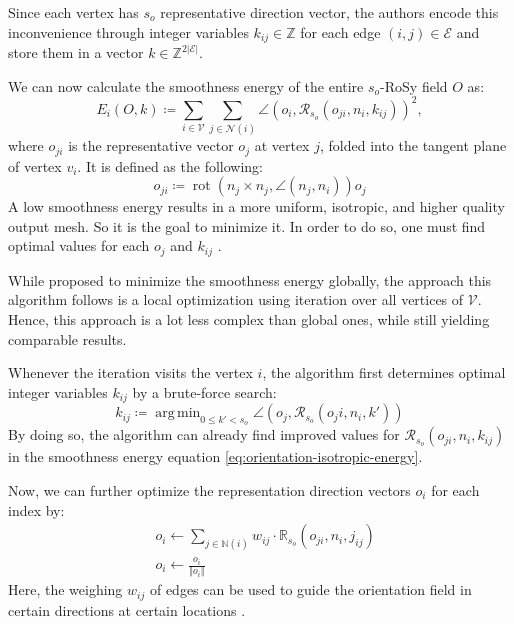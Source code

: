 \documentclass{ACGSeminar}
\DeclareMathOperator{\rot}{rot}
\DeclareMathOperator*{\argmin}{arg\,min}
\begin{document}
Since each vertex has $s_o$ representative direction vector, the authors encode this inconvenience through integer variables $k_{ij} \in \mathbb{Z}$ for each edge $(i,j) \in \mathcal{E}$ and store them in a vector $k \in \mathbb{Z}^{2 \vert \mathcal{E} \vert}$.

We can now calculate the smoothness energy of the entire $s_o$-RoSy field $O$ as:
\begin{equation}\label{eq:orientation-isotropic-energy}
	E_i(O,k) \coloneqq \sum_{i \in \mathcal{V}} \sum_{j \in \mathcal{N}(i)} \angle(o_i, \mathcal{R}_{s_o}(o_{ji}, n_i, k_{ij}))^2,
\end{equation}
where $o_{ji}$ is the representative vector $o_j$ at vertex $j$, folded into the tangent plane of vertex $v_i$. It is defined as the following:
\begin{equation*}
	o_{ji} \coloneqq \rot(n_j \times n_j, \angle(n_j, n_i))o_j
\end{equation*}
A low smoothness energy results in a more uniform, isotropic, and higher quality output mesh. So it is the goal to minimize it. In order to do so, one must find optimal values for each $o_j$ and $k_{ij}$ \cite{jakob2015instant}.\bigskip

While \cite{bommes2009mixed} proposed to minimize the smoothness energy globally, the approach this algorithm follows is a local optimization using iteration over all vertices of $\mathcal{V}$. Hence, this approach is a lot less complex than global ones, while still yielding comparable results.

Whenever the iteration visits the vertex $i$, the algorithm first determines optimal integer variables $k_{ij}$ by a brute-force search:
\begin{equation}\label{eq:orientation-intrinsic-integer}
	k_{ij} \coloneqq \argmin_{0 \leq k' < s_o} \angle(o_j, \mathcal{R}_{s_o}(o_ji, n_i, k'))
\end{equation}
By doing so, the algorithm can already find improved values for $\mathcal{R}_{s_o}(o_{ji}, n_i, k_{ij})$ in the smoothness energy equation \eqref{eq:orientation-isotropic-energy}.

Now, we can further optimize the representation direction vectors $o_i$ for each index by:
\begin{equation}\label{eq:orientation-intrinsic-vector}
\begin{split}
	& o_i \leftarrow \sum_{j \in \mathbb{N}(i)} w_{ij} \cdot \mathbb{R}_{s_o}(o_{ji}, n_i, j_{ij})\\
	& o_i \leftarrow \frac{o_i}{\Vert o_i \Vert}
\end{split}
\end{equation}
Here, the weighing $w_{ij}$ of edges can be used to guide the orientation field in certain directions at certain locations \cite{jakob2015instant}.\bigskip
\end{document}
